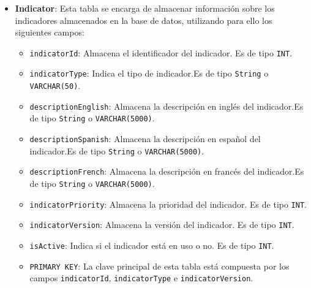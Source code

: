 \begin{itemize}
    \item \textbf{Indicator}: Esta tabla se encarga de almacenar información sobre los indicadores almacenados en la base de datos, utilizando para ello los siguientes campos:
        \begin{itemize}
        \item \texttt{indicatorId}: Almacena el identificador del indicador. Es de tipo \texttt{INT}.
        \item \texttt{indicatorType}: Indica el tipo de indicador.Es de tipo \texttt{String} o \texttt{VARCHAR(50)}.
        \item \texttt{descriptionEnglish}: Almacena la descripción en inglés del indicador.Es de tipo \texttt{String} o \texttt{VARCHAR(5000)}.
        \item \texttt{descriptionSpanish}: Almacena la descripción en español del indicador.Es de tipo \texttt{String} o \texttt{VARCHAR(5000)}.
        \item \texttt{descriptionFrench}: Almacena la descripción en francés del indicador.Es de tipo \texttt{String} o \texttt{VARCHAR(5000)}.
        \item \texttt{indicatorPriority}: Almacena la prioridad del indicador. Es de tipo \texttt{INT}.
        \item \texttt{indicatorVersion}: Almacena la versión del indicador. Es de tipo \texttt{INT}.
        \item \texttt{isActive}: Indica si el indicador está en uso o no. Es de tipo \texttt{INT}.
        \item \texttt{PRIMARY KEY}: La clave principal de esta tabla está compuesta por los campos \texttt{indicatorId}, \texttt{indicatorType} e \texttt{indicatorVersion}.
        \end{itemize}


\end{itemize}
